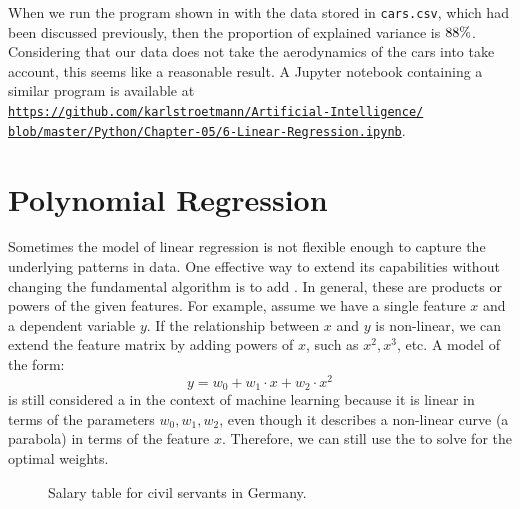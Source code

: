 When we run the program shown in  with the data stored in \texttt{cars.csv},
which had been discussed previously, then the proportion of explained variance is $88 \mathtt{\symbol{37}}$.  Considering that our data does
not take the aerodynamics of the cars into take account, this seems like a reasonable result.  A Jupyter notebook
containing a similar program is available at
\\[0.2cm]
\hspace*{1.3cm}
\href{https://github.com/karlstroetmann/Artificial-Intelligence/blob/master/Python/Chapter-05/6-Linear-Regression.ipynb}{\texttt{https://github.com/karlstroetmann/Artificial-Intelligence/\\
\hspace*{2.2cm}
 blob/master/Python/Chapter-05/6-Linear-Regression.ipynb}}.

\section{Polynomial Regression}
\label{sec:polynomial_regression}

Sometimes the model of linear regression is not flexible enough to capture the underlying patterns in data. One
effective way to extend its capabilities without changing the fundamental algorithm is to add
.
In general, these are products or powers of the given features. For example, assume we have a single feature
$x$ and a dependent variable $y$. If the relationship between $x$ and $y$ is non-linear, we can extend the
feature matrix by adding powers of $x$, such as $x^2, x^3$, etc. 
A model of the form:
\[
y = w_0 + w_1 \cdot x + w_2 \cdot x^2
\]
is still considered a  in the context of machine learning because it is linear in terms of the parameters $w_0, w_1, w_2$, even though it describes a non-linear curve (a parabola) in terms of the feature $x$. Therefore, we can still use the  to solve for the optimal weights.

\begin{figure}[!ht]
  \begin{center}
  \end{center}

\caption{Salary table for civil servants in Germany.}
\label{fig:gehaltstabelle.png}
\end{figure}


